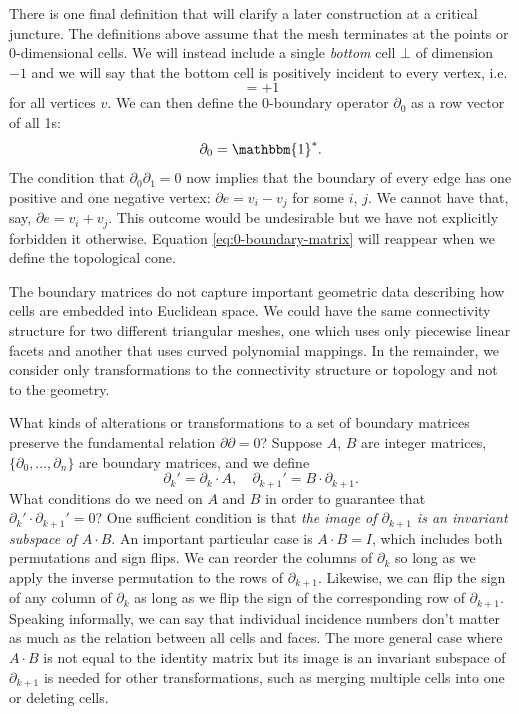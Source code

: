 \documentclass[twocolumn,leqno,twocolumn]{article}
\begin{document}
There is one final definition that will clarify a later construction at a critical juncture.
The definitions above assume that the mesh terminates at the points or 0-dimensional cells.
We will instead include a single \emph{bottom} cell $\bot$ of dimension $-1$ and we will say that the bottom cell is positively incident to every vertex, i.e.
\begin{equation}
    [v, \bot] = +1
\end{equation}
for all vertices $v$.
We can then define the 0-boundary operator $\partial_0$ as a row vector of all 1s:
\begin{equation}
    \partial_0 = \mathbbm{1}^*.
    \label{eq:0-boundary-matrix}
\end{equation}
The condition that $\partial_0\partial_1 = 0$ now implies that the boundary of every edge has one positive and one negative vertex: $\partial e = v_i - v_j$ for some $i$, $j$.
We cannot have that, say, $\partial e = v_i + v_j$.
This outcome would be undesirable but we have not explicitly forbidden it otherwise.
Equation \eqref{eq:0-boundary-matrix} will reappear when we define the topological cone.

The boundary matrices do not capture important geometric data describing how cells are embedded into Euclidean space.
We could have the same connectivity structure for two different triangular meshes, one which uses only piecewise linear facets and another that uses curved polynomial mappings.
In the remainder, we consider only transformations to the connectivity structure or topology and not to the geometry.

What kinds of alterations or transformations to a set of boundary matrices preserve the fundamental relation $\partial\partial = 0$?
Suppose $A$, $B$ are integer matrices, $\{\partial_0, \ldots, \partial_n\}$ are boundary matrices, and we define
\begin{equation}
    \partial_k' = \partial_k\cdot A, \quad \partial_{k + 1}' = B\cdot\partial_{k + 1}.
\end{equation}
What conditions do we need on $A$ and $B$ in order to guarantee that $\partial_k'\cdot\partial_{k + 1}' = 0$?
One sufficient condition is that \emph{the image of $\partial_{k + 1}$ is an invariant subspace of $A\cdot B$}.
An important particular case is $A\cdot B = I$, which includes both permutations and sign flips.
We can reorder the columns of $\partial_k$ so long as we apply the inverse permutation to the rows of $\partial_{k + 1}$.
Likewise, we can flip the sign of any column of $\partial_k$ as long as we flip the sign of the corresponding row of $\partial_{k + 1}$.
Speaking informally, we can say that individual incidence numbers don't matter as much as the relation between all cells and faces.
The more general case where $A\cdot B$ is not equal to the identity matrix but its image is an invariant subspace of $\partial_{k + 1}$ is needed for other transformations, such as merging multiple cells into one or deleting cells.
\end{document}
